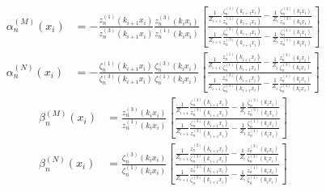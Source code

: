 \begin{subequations}
\begin{align}
\alpha_{n}^{(M)}(x_{i})
&= - \frac{z_{n}^{(1)}(k_{i+1} x_{i})}{z_{n}^{(3)}(k_{i+1} x_{i})} \frac{z_{n}^{(3)}(k_{i} x_{i})}{z_{n}^{(1)}(k_{i} x_{i})}
\left[ \frac{ \frac{1}{Z_{i+1}} \frac{\zeta_{n}^{(1)}(k_{i+1} x_{i})}{z_{n}^{(1)}(k_{i+1} x_{i})} - \frac{1}{Z_{i}} \frac{\zeta_{n}^{(3)}(k_{i} x_{i})}{z_{n}^{(3)}(k_{i} x_{i})} }{ \frac{1}{Z_{i+1}} \frac{\zeta_{n}^{(3)}(k_{i+1} x_{i})}{z_{n}^{(3)}(k_{i+1} x_{i})} - \frac{1}{Z_{i}} \frac{\zeta_{n}^{(1)}(k_{i} x_{i})}{z_{n}^{(1)}(k_{i} x_{i})} } \right]
\\
\alpha_{n}^{(N)}( x_{i})
&= - \frac{\zeta_{n}^{(1)}(k_{i+1} x_{i})}{\zeta_{n}^{(3)}(k_{i+1} x_{i})} \frac{\zeta_{n}^{(3)}(k_{i} x_{i})}{\zeta_{n}^{(1)}(k_{i} x_{i})}
\left[ \frac{ \frac{1}{Z_{i+1}} \frac{z_{n}^{(1)}(k_{i+1} x_{i})}{\zeta_{n}^{(1)}(k_{i+1} x_{i})} - \frac{1}{Z_{i}} \frac{z_{n}^{(3)}(k_{i} x_{i})}{\zeta_{n}^{(3)}(k_{i} x_{i})} }{ \frac{1}{Z_{i+1}} \frac{z_{n}^{(3)}(k_{i+1} x_{i})}{\zeta_{n}^{(3)}(k_{i+1} x_{i})} - \frac{1}{Z_{i}} \frac{z_{n}^{(1)}(k_{i} x_{i})}{\zeta_{n}^{(1)}(k_{i} x_{i})} } \right]
\end{align}
\end{subequations}
%
\begin{subequations}\label{eq:Mie_definition3}
\begin{align}
\beta_{n}^{(M)}( x_{i})
&= \frac{z_{n}^{(3)}(k_{i} x_{i})}{z_{n}^{(1)}(k_{i} x_{i})}
\left[ \frac{ \frac{1}{Z_{i+1}} \frac{\zeta_{n}^{(3)}(k_{i+1} x_{i})}{z_{n}^{(3)}(k_{i+1} x_{i})} - \frac{1}{Z_{i}} \frac{\zeta_{n}^{(3)}(k_{i} x_{i})}{z_{n}^{(3)}(k_{i} x_{i})} }{ \frac{1}{Z_{i+1}} \frac{\zeta_{n}^{(3)}(k_{i+1} x_{i})}{z_{n}^{(3)}(k_{i+1} x_{i})} - \frac{1}{Z_{i}} \frac{\zeta_{n}^{(1)}(k_{i} x_{i})}{z_{n}^{(1)}(k_{i} x_{i})} } \right]
\\
\beta_{n}^{(N)}( x_{i})
&= \frac{\zeta_{n}^{(3)}(k_{i} x_{i})}{\zeta_{n}^{(1)}(k_{i} x_{i})}
\left[ \frac{ \frac{1}{Z_{i+1}} \frac{z_{n}^{(3)}(k_{i+1} x_{i})}{\zeta_{n}^{(3)}(k_{i+1} x_{i})} - \frac{1}{Z_{i}} \frac{z_{n}^{(3)}(k_{i} x_{i})}{\zeta_{n}^{(3)}(k_{i} x_{i})} }{ \frac{1}{Z_{i+1}} \frac{z_{n}^{(3)}(k_{i+1} x_{i})}{\zeta_{n}^{(3)}(k_{i+1} x_{i})} - \frac{1}{Z_{i}} \frac{z_{n}^{(1)}(k_{i} x_{i})}{\zeta_{n}^{(1)}(k_{i} x_{i})} } \right]
\end{align}
\end{subequations}

